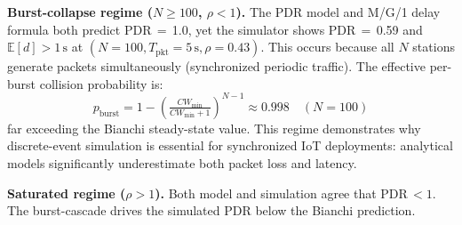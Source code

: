 \documentclass[conference]{IEEEtran}
\begin{document}
\textbf{Burst-collapse regime ($N\!\geq\!100$, $\rho\!<\!1$).}
The PDR model and M/G/1 delay formula both predict PDR\,$=$\,1.0, yet the
simulator shows PDR\,$=$\,0.59 and $\mathbb{E}[d]\!>\!1\,\mathrm{s}$ at
$(N{=}100, T_\mathrm{pkt}{=}5\,\mathrm{s}, \rho{=}0.43)$.
This occurs because all $N$ stations generate packets simultaneously
(synchronized periodic traffic).
The effective per-burst collision probability is:
\begin{equation}
  p_\mathrm{burst} = 1 - \left(\tfrac{CW_\mathrm{min}}{CW_\mathrm{min}+1}\right)^{N-1}
  \approx 0.998 \quad (N{=}100)
\end{equation}
far exceeding the Bianchi steady-state value.
This regime demonstrates why discrete-event simulation is essential for
synchronized IoT deployments: analytical models significantly underestimate
both packet loss and latency.

\textbf{Saturated regime ($\rho\!>\!1$).}
Both model and simulation agree that PDR\,$<\!1$.
The burst-cascade drives the simulated PDR below the Bianchi prediction.
\end{document}

